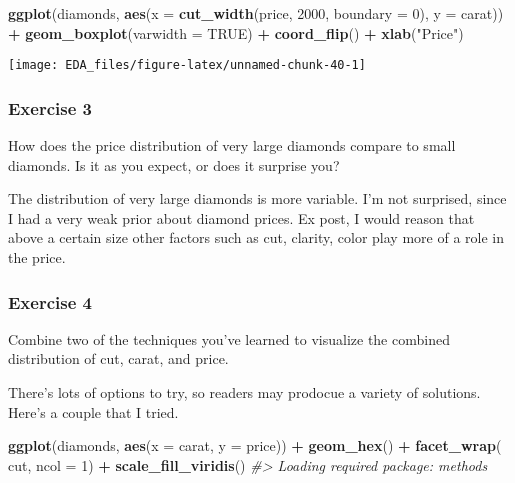 \documentclass[]{book}
\newenvironment{Shaded}{\begin{snugshade}}{\end{snugshade}}
\newcommand{\CommentTok}[1]{\textcolor[rgb]{0.56,0.35,0.01}{\textit{#1}}}
\newcommand{\DataTypeTok}[1]{\textcolor[rgb]{0.13,0.29,0.53}{#1}}
\newcommand{\DecValTok}[1]{\textcolor[rgb]{0.00,0.00,0.81}{#1}}
\newcommand{\KeywordTok}[1]{\textcolor[rgb]{0.13,0.29,0.53}{\textbf{#1}}}
\newcommand{\NormalTok}[1]{#1}
\newcommand{\OperatorTok}[1]{\textcolor[rgb]{0.81,0.36,0.00}{\textbf{#1}}}
\newcommand{\OtherTok}[1]{\textcolor[rgb]{0.56,0.35,0.01}{#1}}
\newcommand{\StringTok}[1]{\textcolor[rgb]{0.31,0.60,0.02}{#1}}
\theoremstyle{definition}
\theoremstyle{definition}
\theoremstyle{definition}
\theoremstyle{remark}
\begin{document}
\begin{Shaded}
\begin{Highlighting}[]
\KeywordTok{ggplot}\NormalTok{(diamonds, }\KeywordTok{aes}\NormalTok{(}\DataTypeTok{x =} \KeywordTok{cut_width}\NormalTok{(price, }\DecValTok{2000}\NormalTok{, }\DataTypeTok{boundary =} \DecValTok{0}\NormalTok{), }\DataTypeTok{y =}\NormalTok{ carat)) }\OperatorTok{+}
\StringTok{  }\KeywordTok{geom_boxplot}\NormalTok{(}\DataTypeTok{varwidth =} \OtherTok{TRUE}\NormalTok{) }\OperatorTok{+}
\StringTok{  }\KeywordTok{coord_flip}\NormalTok{() }\OperatorTok{+}
\StringTok{  }\KeywordTok{xlab}\NormalTok{(}\StringTok{"Price"}\NormalTok{)}
\end{Highlighting}
\end{Shaded}

\begin{center}\texttt{[image: EDA\_files/figure-latex/unnamed-chunk-40-1]} \end{center}

\hypertarget{exercise-3-9}{%
\subsubsection{Exercise 3}\label{exercise-3-9}}

How does the price distribution of very large diamonds compare to small
diamonds. Is it as you expect, or does it surprise you?

The distribution of very large diamonds is more variable. I'm not
surprised, since I had a very weak prior about diamond prices. Ex post,
I would reason that above a certain size other factors such as cut,
clarity, color play more of a role in the price.

\hypertarget{exercise-4-8}{%
\subsubsection{Exercise 4}\label{exercise-4-8}}

Combine two of the techniques you've learned to visualize the combined
distribution of cut, carat, and price.

There's lots of options to try, so readers may prodocue a variety of
solutions. Here's a couple that I tried.

\begin{Shaded}
\begin{Highlighting}[]
\KeywordTok{ggplot}\NormalTok{(diamonds, }\KeywordTok{aes}\NormalTok{(}\DataTypeTok{x =}\NormalTok{ carat, }\DataTypeTok{y =}\NormalTok{ price)) }\OperatorTok{+}
\StringTok{  }\KeywordTok{geom_hex}\NormalTok{() }\OperatorTok{+}
\StringTok{  }\KeywordTok{facet_wrap}\NormalTok{(}\OperatorTok{~}\StringTok{ }\NormalTok{cut, }\DataTypeTok{ncol =} \DecValTok{1}\NormalTok{) }\OperatorTok{+}
\StringTok{  }\KeywordTok{scale_fill_viridis}\NormalTok{()}
\CommentTok{#> Loading required package: methods}
\end{Highlighting}
\end{Shaded}
\end{document}
